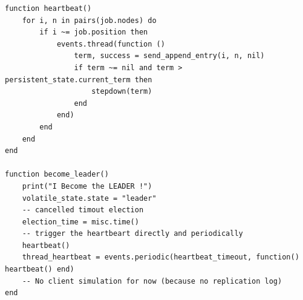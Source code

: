 \documentclass{eplmastersthesis}
\begin{document}
        \begin{minipage}{\linewidth}
        \begin{lstlisting}[style=MySmallLua,caption={Utils functions for the leader only}]
function heartbeat()
    for i, n in pairs(job.nodes) do
        if i ~= job.position then
            events.thread(function ()
                term, success = send_append_entry(i, n, nil)
                if term ~= nil and term > persistent_state.current_term then
                    stepdown(term)
                end
            end)
        end
    end
end

function become_leader()
    print("I Become the LEADER !")
    volatile_state.state = "leader"
    -- cancelled timout election
    election_time = misc.time()
    -- trigger the heartbeart directly and periodically
    heartbeat()
    thread_heartbeat = events.periodic(heartbeat_timeout, function() heartbeat() end)
    -- No client simulation for now (because no replication log)
end
        \end{lstlisting}
        \end{minipage}
\end{document}
